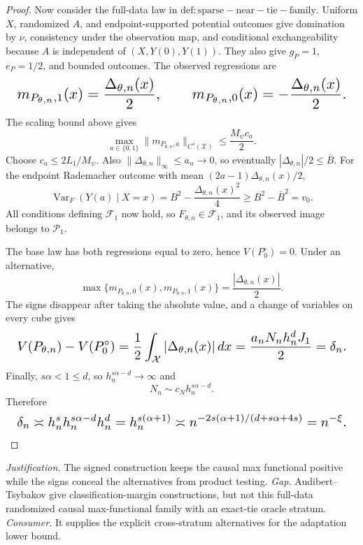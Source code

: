 \documentclass{article}
\begin{document}
\begin{proof}
Now consider the full-data law in \(\mathrm{def:sparse-near-tie-family}\).  Uniform \(X\), randomized \(A\), and endpoint-supported potential outcomes give domination by \(\nu\), consistency under the observation map, and conditional exchangeability because \(A\) is independent of \((X,Y(0),Y(1))\).  They also give \(g_P=1\), \(e_P=1/2\), and bounded outcomes.  The observed regressions are
\[
\makebox[\linewidth][c]{\resizebox{0.98\linewidth}{!}{\(\displaystyle m_{P_{\theta,n},1}(x)=\frac{\Delta_{\theta,n}(x)}2,
 \qquad
 m_{P_{\theta,n},0}(x)=-\frac{\Delta_{\theta,n}(x)}2.\)}}
\]
The scaling bound above gives
\[
 \max_{a\in\{0,1\}}\|m_{P_{\theta,n},a}\|_{C^s(\mathcal X)}
 \le \frac{M_\psi c_a}{2}.
\]
Choose \(c_a\le2L_1/M_\psi\).  Also \(\|\Delta_{\theta,n}\|_\infty\le a_n\to0\), so eventually \(|\Delta_{\theta,n}|/2\le\bar B\).  For the endpoint Rademacher outcome with mean \((2a-1)\Delta_{\theta,n}(x)/2\),
\[
 \operatorname{Var}_F(Y(a)\mid X=x)
 =B^2-\frac{\Delta_{\theta,n}(x)^2}{4}
 \ge B^2-\bar B^2=v_0.
\]
All conditions defining \(\mathcal F_1\) now hold, so \(F_{\theta,n}\in\mathcal F_1\), and its observed image belongs to \(\mathcal P_1\).

The base law has both regressions equal to zero, hence \(V(P_0^\circ)=0\).  Under an alternative,
\[
 \max\{m_{P_{\theta,n},0}(x),m_{P_{\theta,n},1}(x)\}
 =\frac{|\Delta_{\theta,n}(x)|}{2}.
\]
The signs disappear after taking the absolute value, and a change of variables on every cube gives
\[
\makebox[\linewidth][c]{\resizebox{0.98\linewidth}{!}{\(\displaystyle V(P_{\theta,n})-V(P_0^\circ)
 =\frac12\int_{\mathcal X}|\Delta_{\theta,n}(x)|\,dx
 =\frac{a_nN_nh_n^dJ_1}{2}
 =\delta_n.\)}}
\]
Finally, \(s\alpha<1\le d\), so \(h_n^{s\alpha-d}\to\infty\) and
\[
 N_n\sim c_Nh_n^{s\alpha-d}.
\]
Therefore
\[
\makebox[\linewidth][c]{\resizebox{0.98\linewidth}{!}{\(\displaystyle \delta_n\asymp h_n^s h_n^{s\alpha-d}h_n^d
 =h_n^{s(\alpha+1)}
 \asymp n^{-2s(\alpha+1)/(d+s\alpha+4s)}
 =n^{-\xi}.\)}}
\]
\end{proof}
\par\smallskip\noindent \textit{Justification.} The signed construction keeps the causal max functional positive while the signs conceal the alternatives from product testing. \textit{Gap.} Audibert--Tsybakov give classification-margin constructions, but not this full-data randomized causal max-functional family with an exact-tie oracle stratum. \textit{Consumer.} It supplies the explicit cross-stratum alternatives for the adaptation lower bound.
\end{document}
